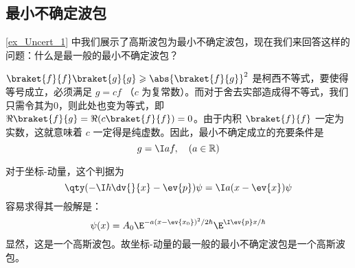 \subsection{最小不确定波包}
\autoref{ex_Uncert_1} 中我们展示了高斯波包为最小不确定波包，现在我们来回答这样的问题：什么是最一般的最小不确定波包？%


$\braket{f}{f} \braket{g}{g} \geqslant \abs{\braket{f}{g}}^2$ 是柯西不等式，要使得等号成立，必须满足 $g=cf$ （$c$ 为复常数）。而对于舍去实部造成得不等式，我们只需令其为0，则此处也变为等式，即 $\Re\braket{f}{g}=\Re( c\braket{f}{f})=0$。由于内积 $\braket{f}{f}$ 一定为实数，这就意味着 $c$ 一定得是纯虚数。因此，最小不确定成立的充要条件是
\begin{equation}
g=\I af,\quad(a\in \mathbb{R})
\end{equation}

对于坐标-动量，这个判据为
\begin{equation}
\qty(-\I\hbar\dv{}{x}-\ev{p})\psi=\I a(x-\ev{x})\psi
\end{equation}
容易求得其一般解是：
\begin{equation}
\psi(x)=A_0\E^{-a(x-\ev{x_0})^2/2\hbar}\E^{\I \ev{p}x/\hbar}
\end{equation}
显然，这是一个高斯波包。故坐标-动量的最一般的最小不确定波包是一个高斯波包。

